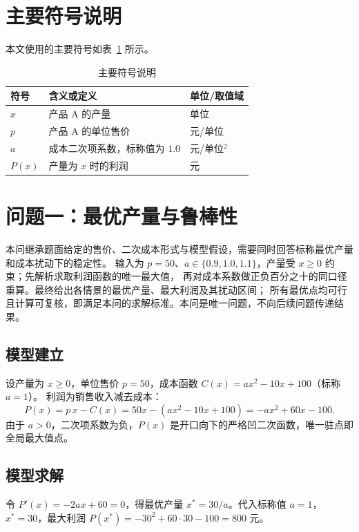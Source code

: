 \documentclass[11pt]{article}
\begin{document}
\section{主要符号说明}
本文使用的主要符号如表~\ref{tab:sym} 所示。

\begin{table}[htbp]
  \centering
  \caption{主要符号说明}
  \label{tab:sym}
  \begin{tabularx}{\textwidth}{>{\centering\arraybackslash}p{}X>{\centering\arraybackslash}p{}}
    \toprule
    符号 & 含义或定义 & 单位/取值域 \\
    \midrule
    $x$ & 产品 A 的产量 & 单位 \\
    $p$ & 产品 A 的单位售价 & 元/单位 \\
    $a$ & 成本二次项系数，标称值为 $1.0$ & 元/单位$^2$ \\
    $P(x)$ & 产量为 $x$ 时的利润 & 元 \\
    \bottomrule
  \end{tabularx}
\end{table}

\section{问题一：最优产量与鲁棒性}
本问继承题面给定的售价、二次成本形式与模型假设，需要同时回答标称最优产量和成本扰动下的稳定性。
输入为 $p=50$、$a\in\{0.9,1.0,1.1\}$，产量受 $x\geq0$ 约束；先解析求取利润函数的唯一最大值，
再对成本系数做正负百分之十的同口径重算。最终给出各情景的最优产量、最大利润及其扰动区间；
所有最优点均可行且计算可复核，即满足本问的求解标准。本问是唯一问题，不向后续问题传递结果。

\subsection{模型建立}
设产量为 $x\geq 0$，单位售价 $p=50$，成本函数 $C(x)=a x^2-10x+100$（标称 $a=1$）。
利润为销售收入减去成本：
\[
P(x)=p\,x-C(x)=50x-(a x^2-10x+100)=-a x^2+60x-100.
\]
由于 $a>0$，二次项系数为负，$P(x)$ 是开口向下的严格凹二次函数，唯一驻点即全局最大值点。

\subsection{模型求解}
令 $P'(x)=-2a x+60=0$，得最优产量 $x^{*}=30/a$。代入标称值 $a=1$，
$x^{*}=30$，最大利润 $P(x^{*})=-30^{2}+60\cdot30-100=800$ 元。
\end{document}
